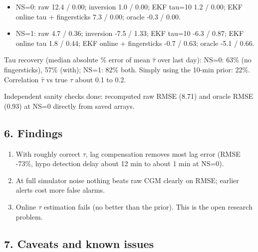 \documentclass[11pt,a4paper]{article}
\providecommand{\tightlist}{\setlength{\itemsep}{0pt}\setlength{\parskip}{0pt}}
\begin{document}
\begin{itemize}
\tightlist
\item
  NS=0: raw 12.4 / 0.00; inversion 1.0 / 0.00; EKF tau=10 1.2 / 0.00;
  EKF online tau + fingersticks 7.3 / 0.00; oracle -0.3 / 0.00.
\item
  NS=1: raw 4.7 / 0.36; inversion -7.5 / 1.33; EKF tau=10 -6.3 / 0.87;
  EKF online tau 1.8 / 0.44; EKF online + fingersticks -0.7 / 0.63;
  oracle -5.1 / 0.66.
\end{itemize}

Tau recovery (median absolute \% error of mean \(\hat\tau\) over last
day): NS=0: 63\% (no fingersticks), 57\% (with); NS=1: 82\% both. Simply
using the 10-min prior: 22\%. Correlation \(\hat\tau\) vs true \(\tau\)
about 0.1 to 0.2.

Independent sanity checks done: recomputed raw RMSE (8.71) and oracle
RMSE (0.93) at NS=0 directly from saved arrays.

\hypertarget{6-findings}{%
\subsection{6. Findings}\label{6-findings}}

\begin{enumerate}
\def\labelenumi{\arabic{enumi}.}
\tightlist
\item
  With roughly correct \(\tau\), lag compensation removes most lag error
  (RMSE -73\%, hypo detection delay about 12 min to about 1 min at
  NS=0).
\item
  At full simulator noise nothing beats raw CGM clearly on RMSE; earlier
  alerts cost more false alarms.
\item
  Online \(\tau\) estimation fails (no better than the prior). This is
  the open research problem.
\end{enumerate}

\hypertarget{7-caveats-and-known-issues}{%
\subsection{7. Caveats and known
issues}\label{7-caveats-and-known-issues}}
\end{document}
